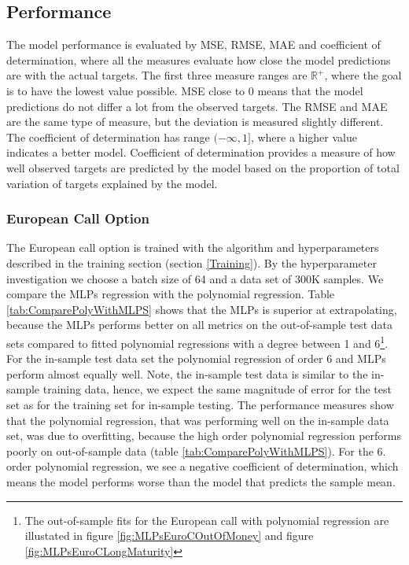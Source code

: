 \subsection{Performance}
The model performance is evaluated by MSE, RMSE, MAE and coefficient of determination, where all the measures evaluate how close the model predictions are with the actual targets. The first three measure ranges are $\mathbb{R}^+$, where the goal is to have the lowest value possible. MSE close to 0 means that the model predictions do not differ a lot from the observed targets. The RMSE and MAE are the same type of measure, but the deviation is measured slightly different. The coefficient of determination has range $(-\infty, 1]$, where a higher value indicates a better model. Coefficient of determination provides a measure of how well observed targets are predicted by the model based on the proportion of total variation of targets explained by the model.

\subsubsection{European Call Option}
The European call option is trained with the algorithm and hyperparameters described in the training section (section \ref{Training}). By the hyperparameter investigation we choose a batch size of 64 and a data set of 300K samples. We compare the MLPs regression with the polynomial regression. Table \ref{tab:ComparePolyWithMLPS} shows that the MLPs is superior at extrapolating, because the MLPs performs better on all metrics on the out-of-sample test data sets compared to fitted polynomial regressions with a degree between 1 and 6\footnote{The out-of-sample fits for the European call with polynomial regression are illustated in figure \ref{fig:MLPsEuroCOutOfMoney} and figure \ref{fig:MLPsEuroCLongMaturity}}. For the in-sample test data set the polynomial regression of order 6 and MLPs perform almost equally well. Note, the in-sample test data is similar to the in-sample training data, hence, we expect the same magnitude of error for the test set as for the training set for in-sample testing. The performance measures show that the polynomial regression, that was performing well on the in-sample data set, was due to overfitting, because the high order polynomial regression performs poorly on out-of-sample data (table \ref{tab:ComparePolyWithMLPS}). For the 6. order polynomial regression, we see a negative coefficient of determination, which means the model performs worse than the model that predicts the sample mean. \\

